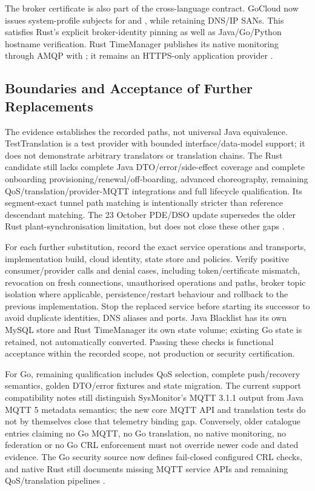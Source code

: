 \documentclass[a4paper]{arrowhead}
\begin{document}
The broker certificate is also part of the cross-language contract. GoCloud now
issues system-profile subjects for 
and , while retaining DNS/IP SANs.
This satisfies Rust's explicit broker-identity pinning as well as Java/Go/Python
hostname verification. Rust TimeManager publishes its native monitoring through
AMQP with ; it remains an HTTPS-only
application provider \cite{goMqtt20261024}.

\subsection{Boundaries and Acceptance of Further Replacements}
The evidence establishes the recorded paths, not universal Java equivalence.
TestTranslation is a test provider with bounded interface/data-model support;
it does not demonstrate arbitrary translators or translation chains. The Rust
candidate still lacks complete Java DTO/error/side-effect coverage and complete
onboarding provisioning/renewal/off-boarding, advanced choreography, remaining
QoS/translation/provider-MQTT integrations and full lifecycle qualification.
Its segment-exact tunnel path matching is intentionally stricter than reference
descendant matching. The 23 October PDE/DSO update supersedes the older Rust
plant-synchronisation limitation, but does not close these other gaps
\cite{goMqtt20261024,rustFederation20261019,nativePde20261023}.

For each further substitution, record the exact service operations and transports,
implementation build, cloud identity, state store and policies. Verify positive
consumer/provider calls and denial cases, including token/certificate mismatch,
revocation on fresh connections, unauthorised operations and paths, broker topic
isolation where applicable, persistence/restart behaviour and rollback to the
previous implementation. Stop the replaced service before starting its successor
to avoid duplicate identities, DNS aliases and ports. Java Blacklist has its own
MySQL store and Rust TimeManager its own state volume; existing Go state is
retained, not automatically converted. Passing these checks is functional
acceptance within the recorded scope, not production or security certification.

For Go, remaining qualification includes QoS selection, complete push/recovery
semantics, golden DTO/error fixtures and state migration. The current support
compatibility notes still distinguish SysMonitor's MQTT 3.1.1 output from Java
MQTT 5 metadata semantics; the new core MQTT API and translation tests do not by
themselves close that telemetry binding gap. Conversely, older catalogue entries
claiming no Go MQTT, no Go translation, no native monitoring, no federation or
no Go CRL enforcement must not override newer code and dated evidence. The Go
security source now defines fail-closed configured CRL checks, and native Rust
still documents missing MQTT service APIs and remaining QoS/translation pipelines
\cite{nativeCompatibility20261024,goMqtt20261024,rustFederation20261019}.
\end{document}
